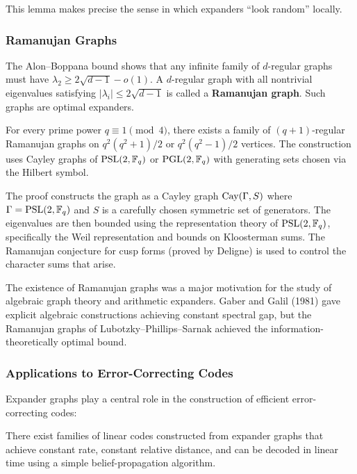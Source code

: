 This lemma makes precise the sense in which expanders ``look random'' locally.

\subsubsection*{Ramanujan Graphs}

The Alon--Boppana bound shows that any infinite family of $d$-regular graphs must have $\lambda_2 \geq 2\sqrt{d-1} - o(1)$. A $d$-regular graph with all nontrivial eigenvalues satisfying $|\lambda_i| \leq 2\sqrt{d-1}$ is called a \textbf{Ramanujan graph}. Such graphs are optimal expanders.

\begin{theorem}
For every prime power $q \equiv 1 \pmod{4}$, there exists a family of $(q+1)$-regular Ramanujan graphs on $q^2(q^2+1)/2$ or $q^2(q^2-1)/2$ vertices. The construction uses Cayley graphs of $\operatorname{PSL}(2, \mathbb{F}_q)$ or $\operatorname{PGL}(2, \mathbb{F}_q)$ with generating sets chosen via the Hilbert symbol.
\end{theorem}

The proof constructs the graph as a Cayley graph $\operatorname{Cay}(\Gamma, S)$ where $\Gamma = \operatorname{PSL}(2, \mathbb{F}_q)$ and $S$ is a carefully chosen symmetric set of generators. The eigenvalues are then bounded using the representation theory of $\operatorname{PSL}(2, \mathbb{F}_q)$, specifically the Weil representation and bounds on Kloosterman sums. The Ramanujan conjecture for cusp forms (proved by Deligne) is used to control the character sums that arise.

\begin{remark}
The existence of Ramanujan graphs was a major motivation for the study of algebraic graph theory and arithmetic expanders. Gaber and Galil (1981) gave explicit algebraic constructions achieving constant spectral gap, but the Ramanujan graphs of Lubotzky--Phillips--Sarnak achieved the information-theoretically optimal bound.
\end{remark}

\subsubsection*{Applications to Error-Correcting Codes}

Expander graphs play a central role in the construction of efficient error-correcting codes:

\begin{theorem}
There exist families of linear codes constructed from expander graphs that achieve constant rate, constant relative distance, and can be decoded in linear time using a simple belief-propagation algorithm.
\end{theorem}

